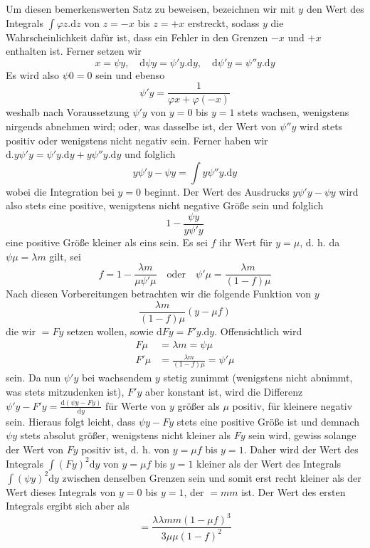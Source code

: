 Um diesen bemerkenswerten Satz zu beweisen, bezeichnen wir mit \(y\) den Wert des Integrals \(\int\varphi z.\mathrm{d}z\) von \(z=-x\) bis \(z=+x\) erstreckt, sodass \(y\) die Wahrscheinlichkeit dafür ist, dass ein Fehler in den Grenzen \(-x\) und \(+x\) enthalten ist. Ferner setzen wir
\[
x=\psi y,\quad \mathrm{d}\psi y=\psi'y.\mathrm{d}y,\quad \mathrm{d}\psi'y=\psi''y.\mathrm{d}y
\]
Es wird also \(\psi0=0\) sein und ebenso
\[
\psi'y=\frac{1}{\varphi x+\varphi(-x)}
\]
weshalb nach Voraussetzung \(\psi'y\) von \(y=0\) bis \(y=1\) stets wachsen, wenigstens nirgends abnehmen wird; oder, was dasselbe ist, der Wert von \(\psi''y\) wird stets positiv oder wenigstens nicht negativ sein. Ferner haben wir \(\mathrm{d}.y\psi'y=\psi'y.\mathrm{d}y+y\psi''y.\mathrm{d}y\) und folglich
\[
y\psi'y-\psi y=\int y\psi''y.\mathrm{d}y
\]
wobei die Integration bei \(y=0\) beginnt. Der Wert des Ausdrucks \(y\psi'y-\psi y\) wird also stets eine positive, wenigstens nicht negative Größe sein und folglich
\[
1-\frac{\psi y}{y\psi'y}
\]
eine positive Größe kleiner als eins sein. Es sei \(f\) ihr Wert für \(y=\mu\), d. h. da \(\psi\mu=\lambda m\) gilt, sei
\[
f=1-\frac{\lambda m}{\mu\psi'\mu}\quad\text{oder}\quad\psi'\mu=\frac{\lambda m}{(1-f)\mu}
\]
Nach diesen Vorbereitungen betrachten wir die folgende Funktion von \(y\)
\[
\frac{\lambda m}{(1-f)\mu}(y-\mu f)
\]
die wir \(=Fy\) setzen wollen, sowie \(\mathrm{d}Fy=F'y.\mathrm{d}y\). Offensichtlich wird
\[
\begin{aligned}
F\mu&=\lambda m=\psi\mu\\[3pt]
F'\mu&=\frac{\lambda m}{(1-f)\mu}=\psi'\mu
\end{aligned}
\]
sein. Da nun \(\psi'y\) bei wachsendem \(y\) stetig zunimmt (wenigstens nicht abnimmt, was stets mitzudenken ist), \(F'y\) aber konstant ist, wird die Differenz \(\psi'y-F'y=\frac{\mathrm{d}(\psi y-Fy)}{\mathrm{d}y}\) für Werte von \(y\) größer als \(\mu\) positiv, für kleinere negativ sein. Hieraus folgt leicht, dass \(\psi y-Fy\) stets eine positive Größe ist und demnach \(\psi y\) stets absolut größer, wenigstens nicht kleiner als \(Fy\) sein wird, gewiss solange der Wert von \(Fy\) positiv ist, d. h. von \(y=\mu f\) bis \(y=1\). Daher wird der Wert des Integrals \(\int(Fy)^2\mathrm{d}y\) von \(y=\mu f\) bis \(y=1\) kleiner als der Wert des Integrals \(\int(\psi y)^2\mathrm{d}y\) zwischen denselben Grenzen sein und somit erst recht kleiner als der Wert dieses Integrals von \(y=0\) bis \(y=1\), der \(=mm\) ist. Der Wert des ersten Integrals ergibt sich aber als
\[
=\frac{\lambda\lambda mm(1-\mu f)^3}{3\mu\mu(1-f)^2}
\]
